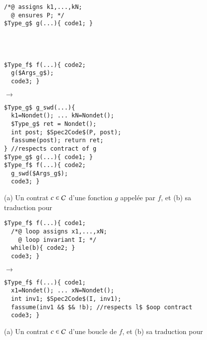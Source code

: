 \begin{figure}[tb]
\begin{center}
\begin{minipage}{0.35\columnwidth}
\begin{lstlisting}[mathescape]
/*@ assigns k1,...,kN;
  @ ensures P; */
$Type_g$ g(...){ code1; }




$Type_f$ f(...){ code2;
  g($Args_g$);
  code3; }
\end{lstlisting}
\end{minipage}
\hspace{-6mm}
\begin{minipage}{0.07\columnwidth}$\to$\end{minipage}
\begin{minipage}{0.35\columnwidth}
\begin{lstlisting}[mathescape]
$Type_g$ g_swd(...){
  k1=Nondet(); ... kN=Nondet();
  $Type_g$ ret = Nondet();
  int post; $Spec2Code$(P, post);
  fassume(post); return ret;
} //respects contract of g
$Type_g$ g(...){ code1; }
$Type_f$ f(...){ code2;
  g_swd($Args_g$);
  code3; }
\end{lstlisting}
\end{minipage}
\vspace{-3mm}
\caption{(a) Un contrat $c\in{\ensuremath\mathcal{C}}$ d'une fonction $g$ appelée par $f$, et
(b) sa traduction %
pour \CWD}
\vspace{-3mm}
\label{fig:CW-transf-functions}
\end{center}
\end{figure}



\begin{figure*}[tb]
\begin{center}
\begin{minipage}{0.35\columnwidth}
\begin{lstlisting}[mathescape]
$Type_f$ f(...){ code1;
  /*@ loop assigns x1,...,xN;
    @ loop invariant I; */
  while(b){ code2; }
  code3; }
\end{lstlisting}
\end{minipage}
\hspace{-6mm}
\begin{minipage}{0.07\columnwidth}$\to$\end{minipage}
\begin{minipage}{0.55\columnwidth}
\begin{lstlisting}[mathescape]
$Type_f$ f(...){ code1;
  x1=Nondet(); ... xN=Nondet();
  int inv1; $Spec2Code$(I, inv1);
  fassume(inv1 &$ $& !b); //respects l$ $oop contract
  code3; }
\end{lstlisting}
\end{minipage}
\vspace{-3mm}
\caption{(a) Un contrat $c\in{\ensuremath\mathcal{C}}$ d'une boucle de $f$, et
(b) sa traduction %
pour \CWD}
\vspace{-3mm}
\label{fig:CW-transf-loops}
\end{center}
\end{figure*}

